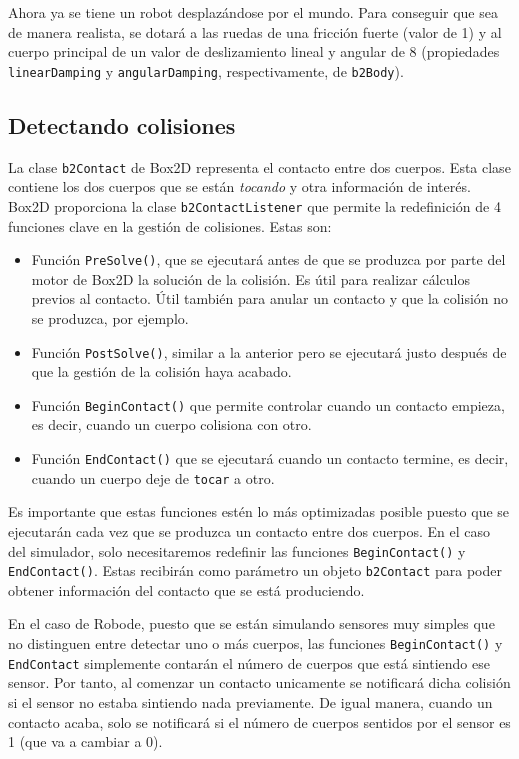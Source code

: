 Ahora ya se tiene un robot desplazándose por el mundo. Para conseguir que sea de manera realista, se dotará a las ruedas de una fricción fuerte (valor de 1) y al cuerpo principal de un valor de deslizamiento lineal y angular de 8 (propiedades \texttt{linearDamping} y \texttt{angularDamping}, respectivamente, de \texttt{b2Body}).



\subsection{Detectando colisiones}
\label{detectando-colisiones}

La clase \texttt{b2Contact} de Box2D representa el contacto entre dos cuerpos. Esta clase contiene los dos cuerpos que se están \emph{tocando} y otra información de interés. Box2D proporciona la clase \texttt{b2ContactListener} que permite la redefinición de 4 funciones clave en la gestión de colisiones. Estas son:

\begin{itemize}
	\item Función \texttt{PreSolve()}, que se ejecutará antes de que se produzca por parte del motor de Box2D la solución de la colisión. Es útil para realizar cálculos previos al contacto. Útil también para anular un contacto y que la colisión no se produzca, por ejemplo.
	\item Función \texttt{PostSolve()}, similar a la anterior pero se ejecutará justo después de que la gestión de la colisión haya acabado.
	\item Función \texttt{BeginContact()} que permite controlar cuando un contacto empieza, es decir, cuando un cuerpo colisiona con otro. 
	\item Función \texttt{EndContact()} que se ejecutará cuando un contacto termine, es decir, cuando un cuerpo deje de \texttt{tocar} a otro.
\end{itemize}

Es importante que estas funciones estén lo más optimizadas posible puesto que se ejecutarán cada vez que se produzca un contacto entre dos cuerpos. En el caso del simulador, solo necesitaremos redefinir las funciones \texttt{BeginContact()} y  \texttt{EndContact()}. Estas recibirán como parámetro un objeto \texttt{b2Contact} para poder obtener información del contacto que se está produciendo.

En el caso de Robode, puesto que se están simulando sensores muy simples que no distinguen entre detectar uno o más cuerpos, las funciones \texttt{BeginContact()} y \texttt{EndContact} simplemente contarán el número de cuerpos que está sintiendo ese sensor. Por tanto, al comenzar un contacto unicamente se notificará dicha colisión si el sensor no estaba sintiendo nada previamente. De igual manera, cuando un contacto acaba, solo se notificará si el número de cuerpos sentidos por el sensor es 1 (que va a cambiar a 0).

